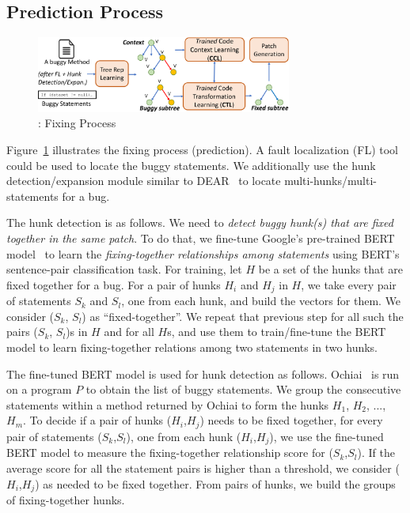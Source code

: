 \subsection{Prediction Process}

\begin{figure}[t]
	\centering
	\includegraphics[width=3.3in]{graphs/overview-predict-5.png}
        \vspace{-6pt}
	\caption{{\tool}: Fixing Process}
	\label{overview-fixing}
\end{figure}

Figure~\ref{overview-fixing} illustrates the fixing process
(prediction). A fault localization (FL) tool could be used to locate
the buggy statements. We additionally use the hunk detection/expansion
module similar to DEAR~\cite{icse22} to locate
multi-hunks/multi-statements for a bug.

The hunk detection is as follows. We need to
{\em detect buggy hunk(s) that are fixed together in the same
  patch}. To do that, we fine-tune Google's pre-trained BERT
model~\cite{devlin2018bert} to learn the {\em fixing-together
  relationships among statements} using BERT's sentence-pair
classification task.
For training, let $H$ be a set of the hunks that are fixed together
for a bug.
For a pair of hunks $H_i$ and $H_j$ in $H$, we take every pair of
statements $S_k$ and $S_l$, one from each hunk, and build the vectors
for them. We consider ($S_k$, $S_l$) as ``fixed-together''. We repeat
that previous step for all such the pairs ($S_k$, $S_l$)s in $H$ and
for all $H$s, and use them to train/fine-tune the BERT model to learn
fixing-together relations among two statements in two hunks.

The fine-tuned BERT model is used for hunk detection as follows.
Ochiai~\cite{abreu2006evaluation} is run on a program $P$ to obtain
the list of buggy statements. We group the consecutive statements
within a method returned by Ochiai to form the hunks $H_1$, $H_2$,
..., $H_m$. To decide if a pair of hunks ($H_i$,$H_j$) needs to be
fixed together, for every pair of statements ($S_k$,$S_l$), one from
each hunk ($H_i$,$H_j$), we use the fine-tuned BERT model to measure
the fixing-together relationship score for ($S_k$,$S_l$). If the
average score for all the statement pairs is higher than a threshold,
we consider ($H_i$,$H_j$) as needed to be fixed together. From pairs
of hunks, we build the groups of fixing-together hunks.

